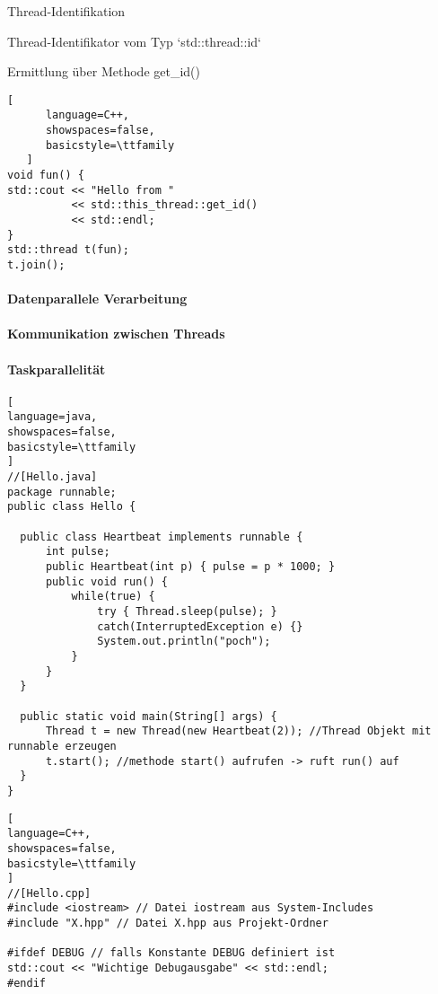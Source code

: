 \documentclass[10pt]{article}
\begin{document}
\begin{itemize*}
Thread-Identifikation
\begin{itemize*}
  \item Thread-Identifikator vom Typ `std::thread::id`
  \item Ermittlung über Methode get\_id()
\end{itemize*}
\begin{lstlisting}[
      language=C++,
      showspaces=false,
      basicstyle=\ttfamily
   ]
void fun() {
std::cout << "Hello from "
          << std::this_thread::get_id()
          << std::endl;
}
std::thread t(fun);
t.join();
\end{lstlisting}



\paragraph{Datenparallele Verarbeitung}
\paragraph{Kommunikation zwischen Threads}
\paragraph{Taskparallelität}






\begin{lstlisting}[
language=java,
showspaces=false,
basicstyle=\ttfamily
]
//[Hello.java]
package runnable;
public class Hello {

  public class Heartbeat implements runnable {
      int pulse;
      public Heartbeat(int p) { pulse = p * 1000; }
      public void run() {
          while(true) {
              try { Thread.sleep(pulse); }
              catch(InterruptedException e) {}
              System.out.println("poch");
          }
      }
  }

  public static void main(String[] args) {
      Thread t = new Thread(new Heartbeat(2)); //Thread Objekt mit runnable erzeugen
      t.start(); //methode start() aufrufen -> ruft run() auf
  }
}
\end{lstlisting}
\hfill

\begin{lstlisting}[
language=C++,
showspaces=false,
basicstyle=\ttfamily
]
//[Hello.cpp]
#include <iostream> // Datei iostream aus System-Includes
#include "X.hpp" // Datei X.hpp aus Projekt-Ordner

#ifdef DEBUG // falls Konstante DEBUG definiert ist
std::cout << "Wichtige Debugausgabe" << std::endl;
#endif


\end{lstlisting}
\end{itemize*}
\end{document}
